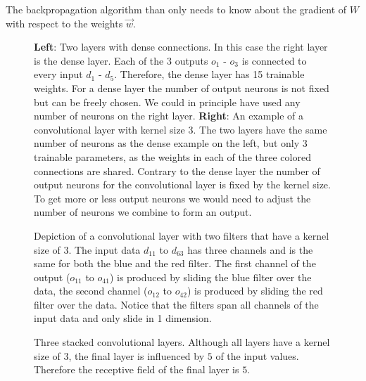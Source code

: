 The backpropagation algorithm than only needs to know about the gradient of $W$ with respect to the weights $\vec{w}$.
\begin{figure}
\centering

\caption[Dense vs. Convolution 1D]{\textbf{Left}: Two layers with dense connections. In this case the right layer is the dense layer. Each of the 3 outputs $o_1$ - $o_3$ is connected to every input $d_1$ - $d_5$. Therefore, the dense layer has 15 trainable weights. For a dense layer the number of output neurons is not fixed but can be freely chosen. We could in principle have used any number of neurons on the right layer. \textbf{Right}: An example of a convolutional layer with kernel size 3. The two layers have the same number of neurons as the dense example on the left, but only 3 trainable parameters, as the weights in each of the three colored connections are shared. Contrary to the dense layer the number of output neurons for the convolutional layer is fixed by the kernel size. To get more or less output neurons we would need to adjust the number of neurons we combine to form an output.}\label{fig:simple_convolution}
\end{figure}
\begin{figure}
\centering

\caption[Convolution with multiple channels]{Depiction of a convolutional layer with two filters that have a kernel size of $3$. The input data $d_{11}$ to $d_{63}$ has three channels and is the same for both the blue and the red filter. The first channel of the output ($o_{11}$ to $o_{41}$) is produced by sliding the blue filter over the data, the second channel ($o_{12}$ to $o_{42}$) is produced by sliding the red filter over the data. Notice that the filters span all channels of the input data and only slide in 1 dimension.}\label{fig:convolution_channels}
\end{figure}
\begin{figure}
\centering

\caption[Receptive field]{Three stacked convolutional layers. Although all layers have a kernel size of $3$, the final layer is influenced by $5$ of the input values. Therefore the receptive field of the final layer is $5$.}\label{fig:receptive_field}
\end{figure}

